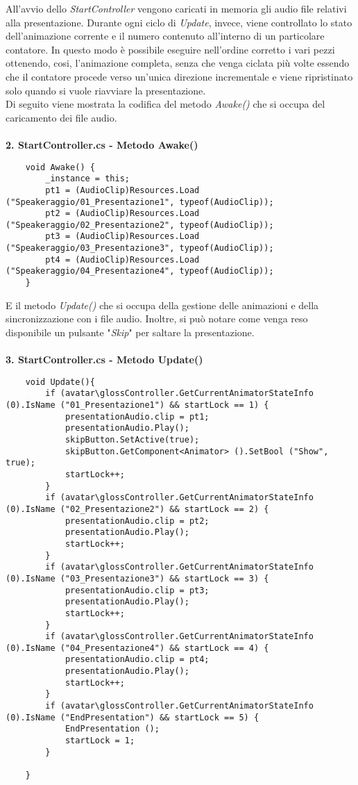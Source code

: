 \noindent
All'avvio dello \textit{StartController} vengono caricati in memoria gli audio file relativi alla presentazione. Durante ogni ciclo di \textit{Update}, invece, viene controllato lo stato dell'animazione corrente e il numero contenuto all'interno di un particolare contatore. In questo modo \`e possibile eseguire nell'ordine corretto i vari pezzi ottenendo, cosi, l'animazione completa, senza che venga ciclata pi\`u volte essendo che il contatore procede verso un'unica direzione incrementale e viene ripristinato solo quando si vuole riavviare la presentazione.\\
\noindent
Di seguito viene mostrata la codifica del metodo \textit{Awake()} che si occupa del caricamento dei file audio.
\\\\
\textbf{2. StartController.cs - Metodo Awake()}
\begin{lstlisting}
	void Awake() {
		_instance = this;
		pt1 = (AudioClip)Resources.Load ("Speakeraggio/01_Presentazione1", typeof(AudioClip));
		pt2 = (AudioClip)Resources.Load ("Speakeraggio/02_Presentazione2", typeof(AudioClip));
		pt3 = (AudioClip)Resources.Load ("Speakeraggio/03_Presentazione3", typeof(AudioClip));
		pt4 = (AudioClip)Resources.Load ("Speakeraggio/04_Presentazione4", typeof(AudioClip));
	}
\end{lstlisting}
\noindent
E il metodo \textit{Update()} che si occupa della gestione delle animazioni e della sincronizzazione con i file audio. Inoltre, si pu\`o notare come venga reso disponibile un pulsante "\textit{Skip}" per saltare la presentazione.
\\\\
\textbf{3. StartController.cs - Metodo Update()}
\begin{lstlisting}
	void Update(){
		if (avatar\glossController.GetCurrentAnimatorStateInfo (0).IsName ("01_Presentazione1") && startLock == 1) {
			presentationAudio.clip = pt1;
			presentationAudio.Play();
			skipButton.SetActive(true);
			skipButton.GetComponent<Animator> ().SetBool ("Show", true);
			startLock++;
		}
		if (avatar\glossController.GetCurrentAnimatorStateInfo (0).IsName ("02_Presentazione2") && startLock == 2) {
			presentationAudio.clip = pt2;
			presentationAudio.Play();
			startLock++;
		}
		if (avatar\glossController.GetCurrentAnimatorStateInfo (0).IsName ("03_Presentazione3") && startLock == 3) {
			presentationAudio.clip = pt3;
			presentationAudio.Play();
			startLock++;
		}
		if (avatar\glossController.GetCurrentAnimatorStateInfo (0).IsName ("04_Presentazione4") && startLock == 4) {
			presentationAudio.clip = pt4;
			presentationAudio.Play();
			startLock++;
		}
		if (avatar\glossController.GetCurrentAnimatorStateInfo (0).IsName ("EndPresentation") && startLock == 5) {
			EndPresentation ();
			startLock = 1;
		}
	
	}
\end{lstlisting}
